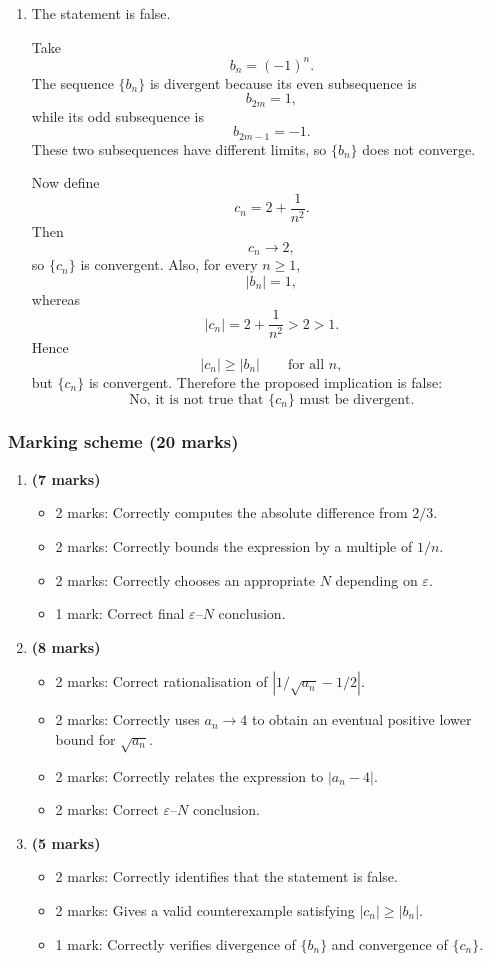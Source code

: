 \documentclass[12pt]{article}
\begin{document}
\begin{enumerate}[label=(\alph*)]
\item The statement is false.

Take
\[
b_n=(-1)^n.
\]
The sequence $\{b_n\}$ is divergent because its even subsequence is
\[
b_{2m}=1,
\]
while its odd subsequence is
\[
b_{2m-1}=-1.
\]
These two subsequences have different limits, so $\{b_n\}$ does not converge.

Now define
\[
c_n=2+\frac1{n^2}.
\]
Then
\[
c_n\to 2,
\]
so $\{c_n\}$ is convergent. Also, for every $n\ge1$,
\[
|b_n|=1,
\]
whereas
\[
|c_n|=2+\frac1{n^2}>2>1.
\]
Hence
\[
|c_n|\ge |b_n|
\qquad\text{for all }n,
\]
but $\{c_n\}$ is convergent. Therefore the proposed implication is false:
\[
\boxed{\text{No, it is not true that }\{c_n\}\text{ must be divergent}.}
\]
\end{enumerate}

\subsubsection{Marking scheme (20 marks)}

\begin{enumerate}[label=(\alph*)]
\item \textbf{(7 marks)}
\begin{itemize}
\item 2 marks: Correctly computes the absolute difference from $2/3$.
\item 2 marks: Correctly bounds the expression by a multiple of $1/n$.
\item 2 marks: Correctly chooses an appropriate $N$ depending on $\varepsilon$.
\item 1 mark: Correct final $\varepsilon$--$N$ conclusion.
\end{itemize}

\item \textbf{(8 marks)}
\begin{itemize}
\item 2 marks: Correct rationalisation of $\left|1/\sqrt{a_n}-1/2\right|$.
\item 2 marks: Correctly uses $a_n\to4$ to obtain an eventual positive lower bound for $\sqrt{a_n}$.
\item 2 marks: Correctly relates the expression to $|a_n-4|$.
\item 2 marks: Correct $\varepsilon$--$N$ conclusion.
\end{itemize}

\item \textbf{(5 marks)}
\begin{itemize}
\item 2 marks: Correctly identifies that the statement is false.
\item 2 marks: Gives a valid counterexample satisfying $|c_n|\ge |b_n|$.
\item 1 mark: Correctly verifies divergence of $\{b_n\}$ and convergence of $\{c_n\}$.
\end{itemize}
\end{enumerate}
\end{document}
